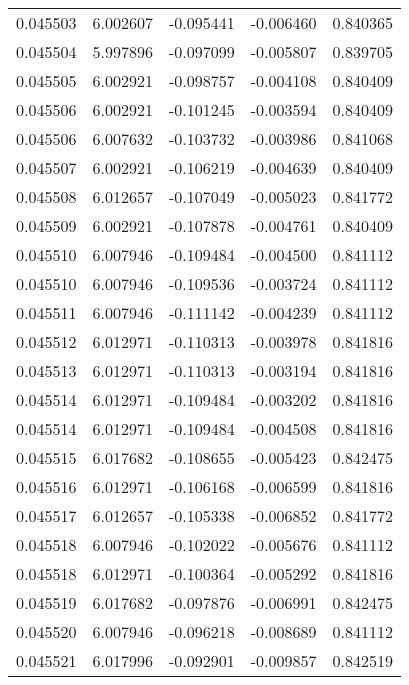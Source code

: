 \begin{tabular}{lrrrr}
0.045503    &  6.002607 & -0.095441 & -0.006460 &             0.840365 \\
0.045504    &  5.997896 & -0.097099 & -0.005807 &             0.839705 \\
0.045505    &  6.002921 & -0.098757 & -0.004108 &             0.840409 \\
0.045506    &  6.002921 & -0.101245 & -0.003594 &             0.840409 \\
0.045506    &  6.007632 & -0.103732 & -0.003986 &             0.841068 \\
0.045507    &  6.002921 & -0.106219 & -0.004639 &             0.840409 \\
0.045508    &  6.012657 & -0.107049 & -0.005023 &             0.841772 \\
0.045509    &  6.002921 & -0.107878 & -0.004761 &             0.840409 \\
0.045510    &  6.007946 & -0.109484 & -0.004500 &             0.841112 \\
0.045510    &  6.007946 & -0.109536 & -0.003724 &             0.841112 \\
0.045511    &  6.007946 & -0.111142 & -0.004239 &             0.841112 \\
0.045512    &  6.012971 & -0.110313 & -0.003978 &             0.841816 \\
0.045513    &  6.012971 & -0.110313 & -0.003194 &             0.841816 \\
0.045514    &  6.012971 & -0.109484 & -0.003202 &             0.841816 \\
0.045514    &  6.012971 & -0.109484 & -0.004508 &             0.841816 \\
0.045515    &  6.017682 & -0.108655 & -0.005423 &             0.842475 \\
0.045516    &  6.012971 & -0.106168 & -0.006599 &             0.841816 \\
0.045517    &  6.012657 & -0.105338 & -0.006852 &             0.841772 \\
0.045518    &  6.007946 & -0.102022 & -0.005676 &             0.841112 \\
0.045518    &  6.012971 & -0.100364 & -0.005292 &             0.841816 \\
0.045519    &  6.017682 & -0.097876 & -0.006991 &             0.842475 \\
0.045520    &  6.007946 & -0.096218 & -0.008689 &             0.841112 \\
0.045521    &  6.017996 & -0.092901 & -0.009857 &             0.842519 \\

\end{tabular}
